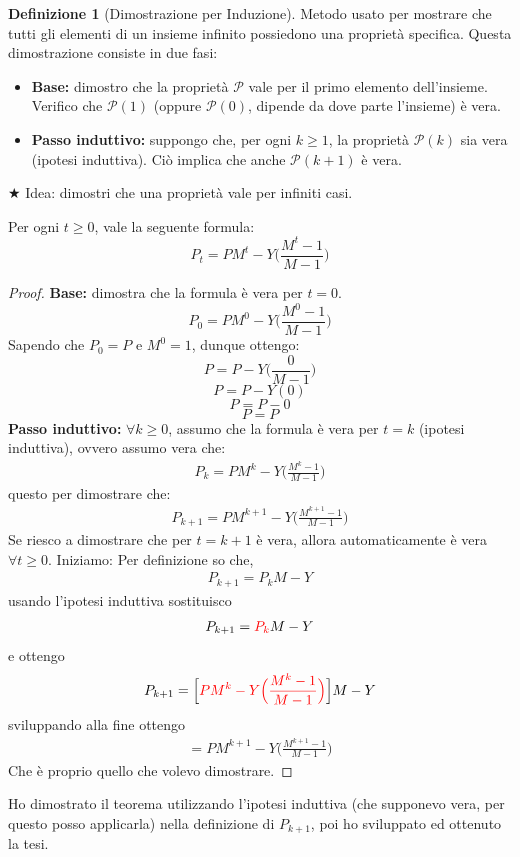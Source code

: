 \documentclass{article}  %
\theoremstyle{definition}
\newtheorem{definition}{Definizione}[section]
\begin{document}
\begin{definition}[Dimostrazione per Induzione]
Metodo usato per mostrare che tutti gli elementi di un insieme infinito possiedono una proprietà specifica. Questa dimostrazione
consiste in due fasi:
\begin{itemize}
  \item \textbf{Base:} dimostro che la proprietà \(\mathcal{P}\) vale per il primo elemento dell'insieme. Verifico che $\mathcal{P}(1)$ (oppure $\mathcal{P}(0)$, dipende da dove parte l'insieme) è vera. 
  \item \textbf{Passo induttivo:} suppongo che, per ogni $k \geq 1$, la proprietà $\mathcal{P}(k)$ sia vera (ipotesi induttiva). Ciò implica che anche $\mathcal{P}(k+1)$ è vera.
\end{itemize}

\end{definition}
\(\bigstar\) Idea: dimostri che una proprietà vale per infiniti casi.
\begin{esempio}[Esempio]
\footnotesize %
Per ogni $t \geq 0$, vale la seguente formula: \newline
\[
P_t=PM^t-Y\Big(\frac{M^t-1}{M-1}\Big)
\]
\begin{proof}
\textbf{Base:} dimostra che la formula è vera per $t=0$.
\[
P_0=PM^0-Y\Big(\frac{M^0-1}{M-1}\Big)
\]
Sapendo che $P_0=P$ e $M^0=1$, dunque ottengo:
\[
P=P-Y\Big(\frac{0}{M-1}\Big)
\]
\[
P=P-Y(0)
\]
\[
P=P-0
\]
\[
P=P
\]
\textbf{Passo induttivo:} \(\forall{k}\geq0\), assumo che la formula è vera per $t=k$ (ipotesi induttiva), ovvero assumo vera che:
\begin{align*}
  P_k=PM^k-Y\Big(\frac{M^k-1}{M-1}\Big) \tag*{(ipotesi induttiva)}
\end{align*}
questo per dimostrare che:
\begin{align*}
  P_{k+1}=PM^{k+1}-Y\Big(\frac{M^{k+1}-1}{M-1}\Big) \tag*{(tesi)}
\end{align*}
Se riesco a dimostrare che per $t=k+1$ è vera, allora automaticamente è vera $\forall{t}\geq 0$.
Iniziamo:\newline
Per definizione so che,
\begin{align*}
  P_{k+1}=P_kM-Y
\end{align*}
usando l'ipotesi induttiva sostituisco
\begin{align*}
  P_{k+1}= \textcolor{red}{P_k} M-Y
\end{align*}
e ottengo
\begin{align*}
  P_{k+1}= \Big[\textcolor{red}{PM^k-Y\Big(\frac{M^k-1}{M-1}\Big)} \Big] M-Y
\end{align*}
sviluppando alla fine ottengo
\begin{align*}
  = PM^{k+1}-Y \Big(\frac{M^{k+1}-1}{M-1}\Big)
\end{align*}
Che è proprio quello che volevo dimostrare.
\end{proof}
Ho dimostrato il teorema utilizzando l'ipotesi induttiva (che supponevo vera, per questo posso applicarla) 
nella definizione di $P_{k+1}$, poi ho sviluppato ed ottenuto la tesi.
\end{esempio}
\end{document}
